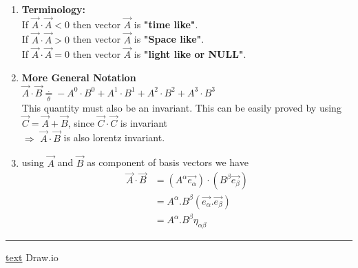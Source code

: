 \documentclass[11pt,a4paper]{article}
\begin{document}
\begin{enumerate}
\begin{enumerate}
\begin{enumerate}
                        \item \textbf{Terminology:}\\
                              If $\vec{A}\cdot\vec{A} < 0$ then vector $\vec{A}$ is \textbf{"time like"}.\\
                              If $\vec{A}\cdot\vec{A} > 0$ then vector $\vec{A}$ is \textbf{"Space like"}.\\
                              If $\vec{A}\cdot\vec{A} = 0$ then vector $\vec{A}$ is \textbf{"light like or NULL"}.\\
                        \item \textbf{More General Notation}\\
                              $\vec{A}\cdot\vec{B} \mathop = \limits^{.}_{\theta} - A^0\cdot B^0 + A^1\cdot B^1 + A^2\cdot B^2 + A^3\cdot B^3$\\
                              This quantity must also be an invariant. This can be easily proved by using $\vec{C}=\vec{A}+\vec{B}$, since $\vec{C}\cdot\vec{C}$ is invariant\\
                              $\Rightarrow$ $ \vec{A}\cdot\vec{B}$ is also lorentz invariant.
                        \item using $\vec{A}$ and $\vec{B}$ as component of basis vectors we have
                              \begin{align*}
                                  \vec{A}\cdot\vec{B} & = (A^{\alpha}\vec{e_{\alpha}})\cdot(B^{\beta}\vec{e_{\beta}}) \\
                                                      & = A^{\alpha}.B^{\beta} (\vec{e_{\alpha}}.\vec{e_{\beta}})     \\
                                                      & = A^{\alpha}.B^{\beta} {\displaystyle{\eta_{\alpha\beta}}}
                              \end{align*}
                    \end{enumerate}
          \end{enumerate}
\end{enumerate}
\noindent\rule{\textwidth}{1pt}
\href{https://youtu.be/TiHHz3sKDbY?list=PL6Q1107aDr%SgQ1DBEugejXLfQX76hfSnX&t=1188}{text} Draw.io
\end{document}

